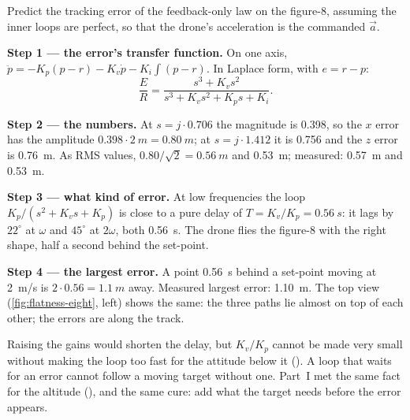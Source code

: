 \begin{example}
\label{ex:flatness-lag}
Predict the tracking error of the feedback-only law on the figure-8, assuming the inner loops are perfect, so that the drone's acceleration is the commanded $\vec a$.

\textbf{Step 1 — the error's transfer function.} On one axis, $\ddot p = -K_p(p - r) - K_v\dot p - K_i\!\int(p - r)$. In Laplace form, with $e = r - p$:
\begin{equation*}
  \frac{E}{R} = \frac{s^3 + K_v s^2}{s^3 + K_v s^2 + K_p s + K_i} .
\end{equation*}

\textbf{Step 2 — the numbers.} At $s = j\cdot0.706$ the magnitude is 0.398, so the $x$ error has the amplitude $0.398 \cdot \SI{2}{m} = \SI{0.80}{m}$; at $s = j\cdot1.412$ it is 0.756 and the $z$ error is \SI{0.76}{m}. As RMS values, $0.80/\sqrt2 = \SI{0.56}{m}$ and \SI{0.53}{m}; measured: \SI{0.57}{m} and \SI{0.53}{m}.

\textbf{Step 3 — what kind of error.} At low frequencies the loop $K_p/(s^2 + K_vs + K_p)$ is close to a pure delay of $T = K_v/K_p = \SI{0.56}{s}$: it lags by $22^\circ$ at $\omega$ and $45^\circ$ at $2\omega$, both \SI{0.56}{s}. The drone flies the figure-8 with the right shape, half a second behind the set-point.

\textbf{Step 4 — the largest error.} A point \SI{0.56}{s} behind a set-point moving at \SI{2}{m/s} is $2 \cdot 0.56 = \SI{1.1}{m}$ away. Measured largest error: \SI{1.10}{m}. The top view (\cref{fig:flatness-eight}, left) shows the same: the three paths lie almost on top of each other; the errors are along the track.
\end{example}


Raising the gains would shorten the delay, but $K_v/K_p$ cannot be made very small without making the loop too fast for the attitude below it (). A loop that waits for an error cannot follow a moving target without one. Part~I met the same fact for the altitude (), and the same cure: add what the target needs before the error appears.

